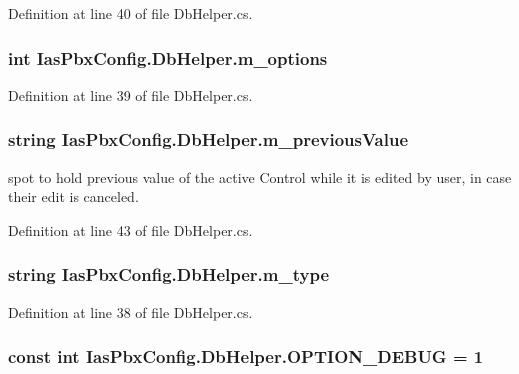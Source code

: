 Definition at line 40 of file DbHelper.cs.\hypertarget{class_ias_pbx_config_1_1_db_helper_a0efac22d5176062fc601faff46508240}{
\subsubsection[{m\_\-options}]{\setlength{\rightskip}{0pt plus 5cm}int {\bf IasPbxConfig.DbHelper.m\_\-options}}}
\label{class_ias_pbx_config_1_1_db_helper_a0efac22d5176062fc601faff46508240}


Definition at line 39 of file DbHelper.cs.\hypertarget{class_ias_pbx_config_1_1_db_helper_af297028c911777148642b2eed5c2d42b}{
\subsubsection[{m\_\-previousValue}]{\setlength{\rightskip}{0pt plus 5cm}string {\bf IasPbxConfig.DbHelper.m\_\-previousValue}}}
\label{class_ias_pbx_config_1_1_db_helper_af297028c911777148642b2eed5c2d42b}


spot to hold previous value of the active Control while it is edited by user, in case their edit is canceled. 

Definition at line 43 of file DbHelper.cs.\hypertarget{class_ias_pbx_config_1_1_db_helper_a6b83549fc7774e7b50312bcc61a53f77}{
\subsubsection[{m\_\-type}]{\setlength{\rightskip}{0pt plus 5cm}string {\bf IasPbxConfig.DbHelper.m\_\-type}}}
\label{class_ias_pbx_config_1_1_db_helper_a6b83549fc7774e7b50312bcc61a53f77}


Definition at line 38 of file DbHelper.cs.\hypertarget{class_ias_pbx_config_1_1_db_helper_a13592d975c10f3fe39a3577b741efcac}{
\subsubsection[{OPTION\_\-DEBUG}]{\setlength{\rightskip}{0pt plus 5cm}const int {\bf IasPbxConfig.DbHelper.OPTION\_\-DEBUG} = 1}}
\label{class_ias_pbx_config_1_1_db_helper_a13592d975c10f3fe39a3577b741efcac}


